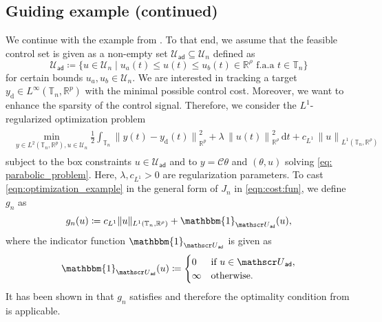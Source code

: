 \documentclass[reqno]{amsart}
\newcommand{\U}{{\mathscr U}}
\newcommand{\R}{\mathbb R}
\newcommand{\Uad}{\U_{\mathsf{ad}}}
\newcommand{\timeInt}{\mathbb{T}}
\newcommand{\state}{\theta}
\newcommand{\desired}[1]{#1_{\mathrm{d}}}
\newcommand{\inpVar}{u}
\newcommand{\inpVarDim}{\rho}
\newcommand{\outVar}{y}
\newcommand{\outVarDes}{\desired{y}}
\newcommand{\outVarDim}{p}
\newcommand{\lonereg}{c_{L^1}}
\newcommand{\dt}{\,\mathrm{d}t}
\newcommand{\cOper}{\calC}
\newcommand{\calC}{\mathcal{C}}
\begin{document}
\subsection{Guiding example (continued)}
\label{subsec:exampleContinued}
%
We continue with the example from . To that end, we assume that the feasible control set is given as a non-empty set $\Uad \subseteq \U_n$ defined as
%
\begin{equation}\nonumber
    \Uad \coloneqq \big\{u\in \U_n \mid \inpVar_a(t) \leq u(t)\leq \inpVar_b(t) \in \R^{\inpVarDim} \text{ f.a.a }t\in \timeInt_n\big\}
\end{equation}
%
for certain bounds $\inpVar_a, \inpVar_b\in \U_n$. We are interested in tracking a target $\outVarDes\in L^\infty(\timeInt_n,\R^{\outVarDim})$ with the minimal possible control cost. Moreover, we want to enhance the sparsity of the control signal. Therefore, we consider the $L^1$-regularized optimization problem
%
\begin{align}
\label{eqn:optimization_example}
\begin{aligned}
    \min\limits_{\outVar\in L^2(\timeInt_n,\R^\outVarDim),\inpVar\in\U_n} \tfrac{1}{2} \int_{\timeInt_n} {\|{\outVar}(t)-\outVarDes(t)\|}^2_{\R^{\outVarDim}}+ \lambda\,{\|\inpVar(t)\|}_{\R^\inpVarDim}^2 \dt + \lonereg\,{\|\inpVar \|}_{L^1(\timeInt_n, \R^\inpVarDim)}
    \end{aligned}
\end{align}
%
subject to the box constraints $\inpVar\in \Uad$ and to $\outVar=\cOper\state$ and $(\state, \inpVar)$ solving \eqref{eq: parabolic_problem}. Here, $ \lambda, \lonereg>0$ are regularization parameters. To cast \eqref{eqn:optimization_example} in the general form of $J_n$ in \eqref{eqn:cost:fun}, we define~$g_n$ as
%
\begin{equation}\nonumber
    g_n(\inpVar) \coloneqq \lonereg \|\inpVar \|_{L^1(\timeInt_n,\R^\inpVarDim)} + \mathbbm{1}_{\Uad}(u),
\end{equation}
%
where the indicator function $\mathbbm{1}_{\Uad}$ is given as
%
\begin{equation}\nonumber
    \mathbbm{1}_{\Uad}(u) \coloneqq
        \begin{cases}
        0&\text{if }u\in \Uad,\\
        \infty&\text{otherwise}.
	\end{cases}
\end{equation}
%
It has been shown in \cite{azmi2023nonmonotone} that $g_n$ satisfies  and therefore the optimality condition from  is applicable.
%
\end{document}
